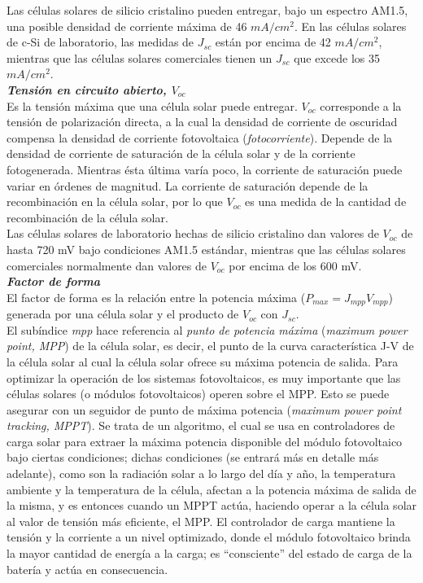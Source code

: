 \documentclass[12pt]{article}
\begin{document}
	\noindent Las células solares de silicio cristalino pueden entregar, bajo un espectro AM1.5, una posible densidad de corriente máxima de 46 $mA/cm^2$. En las células solares de c-Si de laboratorio, las medidas de $J_{sc}$ están por encima de 42 $mA/cm^2$, mientras que las células solares comerciales tienen un $J_{sc}$ que excede los 35 $mA/cm^2$. \\
	
	\noindent \textit{\textbf{Tensión en circuito abierto, $V_{oc}$}} \\
	
	\noindent Es la tensión máxima que una célula solar puede entregar. $V_{oc}$ corresponde a la tensión de polarización directa, a la cual la densidad de corriente de oscuridad compensa la densidad de corriente fotovoltaica (\textit{fotocorriente}). Depende de la densidad de corriente de saturación de la célula solar y de la corriente fotogenerada. Mientras ésta última varía poco, la corriente de saturación puede variar en órdenes de magnitud. La corriente de saturación depende de la recombinación en la célula solar, por lo que $V_{oc}$ es una medida de la cantidad de recombinación de la célula solar.\\
	
	\noindent Las células solares de laboratorio hechas de silicio cristalino dan valores de $V_{oc}$ de hasta 720 mV bajo condiciones AM1.5 estándar, mientras que las células solares comerciales normalmente dan valores de $V_{oc}$ por encima de los 600 mV. \\
	
	\noindent \textit{\textbf{Factor de forma}} \\
	
	\noindent El factor de forma es la relación entre la potencia máxima ($P_{max} = J_{mpp} V_{mpp}$) generada por una célula solar y el producto de $V_{oc}$ con $J_{sc}$. \\
	
	\noindent El subíndice \textit{mpp} hace referencia al \textit{punto de potencia máxima} (\textit{maximum power point, MPP}) de la célula solar, es decir, el punto de la curva característica J-V de la célula solar al cual la célula solar ofrece su máxima potencia de salida.  Para optimizar la operación de los sistemas fotovoltaicos, es muy importante que las células solares (o módulos fotovoltaicos) operen sobre el MPP. Esto se puede asegurar con un seguidor de punto de máxima potencia (\textit{maximum power point tracking, MPPT}). Se trata de un algoritmo, el cual se usa en controladores de carga solar para extraer la máxima potencia disponible del módulo fotovoltaico bajo ciertas condiciones; dichas condiciones (se entrará más en detalle más adelante), como son la radiación solar a lo largo del día y año, la temperatura ambiente y la temperatura de la célula, afectan a la potencia máxima de salida de la misma, y es entonces cuando un MPPT actúa, haciendo operar a la célula solar al valor de tensión más eficiente, el MPP. El controlador de carga mantiene la tensión y la corriente a un nivel optimizado, donde el módulo fotovoltaico brinda la mayor cantidad de energía a la carga; es ``consciente'' del estado de carga de la batería y actúa en consecuencia. \\
	
\end{document}

